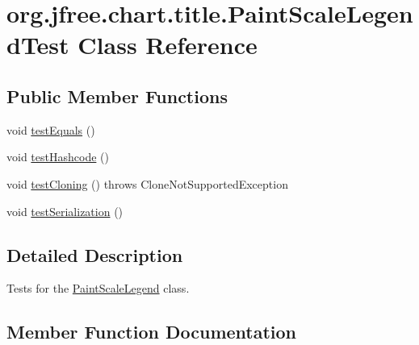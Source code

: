 \hypertarget{classorg_1_1jfree_1_1chart_1_1title_1_1_paint_scale_legend_test}{}\section{org.\+jfree.\+chart.\+title.\+Paint\+Scale\+Legend\+Test Class Reference}
\label{classorg_1_1jfree_1_1chart_1_1title_1_1_paint_scale_legend_test}
\subsection*{Public Member Functions}
\begin{DoxyCompactItemize}
\item 
void \mbox{\hyperlink{classorg_1_1jfree_1_1chart_1_1title_1_1_paint_scale_legend_test_abeabdf13db50859301f3f8cdad84de16}{test\+Equals}} ()
\item 
void \mbox{\hyperlink{classorg_1_1jfree_1_1chart_1_1title_1_1_paint_scale_legend_test_a9274068b646712db44dd63a54f153bc5}{test\+Hashcode}} ()
\item 
void \mbox{\hyperlink{classorg_1_1jfree_1_1chart_1_1title_1_1_paint_scale_legend_test_ad95885577e7fee70dd69c9d9783f44a5}{test\+Cloning}} ()  throws Clone\+Not\+Supported\+Exception 
\item 
void \mbox{\hyperlink{classorg_1_1jfree_1_1chart_1_1title_1_1_paint_scale_legend_test_a7c7ec8f77ce9edd08ad03bda989d5733}{test\+Serialization}} ()
\end{DoxyCompactItemize}


\subsection{Detailed Description}
Tests for the \mbox{\hyperlink{classorg_1_1jfree_1_1chart_1_1title_1_1_paint_scale_legend}{Paint\+Scale\+Legend}} class. 

\subsection{Member Function Documentation}
\mbox{\label{classorg_1_1jfree_1_1chart_1_1title_1_1_paint_scale_legend_test_ad95885577e7fee70dd69c9d9783f44a5}} 
